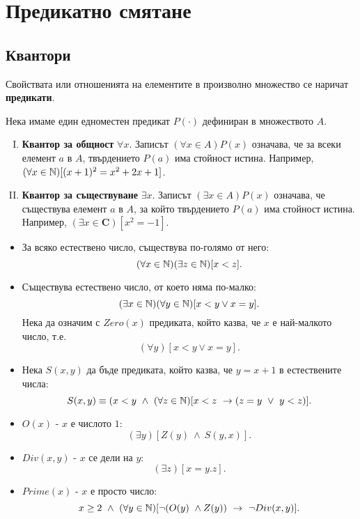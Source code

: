 \section{Предикатно смятане}

\subsection*{Квантори}

Свойствата или отношенията на елементите в произволно множество се наричат {\bf предикати}.

Нека имаме един едноместен предикат $P(\cdot)$ дефиниран в множеството $A$.
\begin{enumerate}[(I)]
\item 
  {\bf Квантор за общност} $\forall x$.
  Записът $(\forall x \in A) P(x)$ означава, че за всеки елемент $a$ в $A$, 
  твърдението $P(a)$ има стойност истина.
  Например, $(\forall x\in\mathbb{N})[(x+1)^2 = x^2+2x+1]$.
\item
  {\bf Квантор за съществуване} $\exists x$.
  Записът $(\exists x \in A) P(x)$ означава, че съществува елемент $a$ в $A$, 
  за който твърдението $P(a)$ има стойност истина.
  Например, $(\exists x \in\mathbf{C})[x^2 = -1]$.
\end{enumerate}

\begin{example}
  \begin{itemize}
  \item
    За всяко естествено число, съществува по-голямо от него:
    \[(\forall x\in\mathbb{N})(\exists z\in\mathbb{N})[x < z].\]
  \item
    Съществува естествено число, от което няма по-малко:
    \[(\exists x\in\mathbb{N})(\forall y\in\mathbb{N})[x < y \vee x = y].\]
    Нека да означим с $Zero(x)$ предиката, който казва, че $x$ е най-малкото число, т.е.
    \[(\forall y)[x < y \vee x =y].\]
  \item
    Нека $S(x,y)$ да бъде предиката, който казва, че $y = x+1$ в естествените числа:
    \[S(x,y) \equiv (x < y\ \wedge\ (\forall z\in\mathbb{N})[x < z\ \rightarrow (z = y\ \vee\ y < z)].\]
  \item
    $O(x)$ - $x$ е числото $1$:
    \[(\exists y)[Z(y)\ \wedge\ S(y,x)].\]
  \item
    $Div(x,y)$ - $x$ се дели на $y$:
    \[(\exists z)[x = y.z].\]
  \item
    $Prime(x)$ - $x$ е просто число:
    \[x \geq 2\ \wedge\ (\forall y\in\mathbb{N})[\neg (O(y)\ \wedge Z(y))\ \rightarrow\ \neg Div(x,y)].\]
  \end{itemize}
\end{example}


